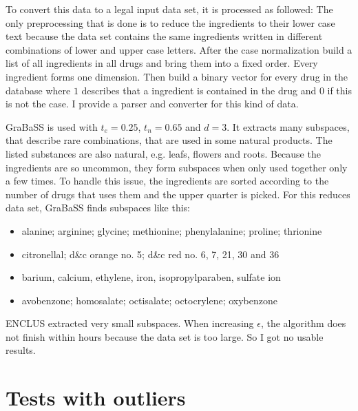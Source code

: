 To convert this data to a legal input data set, it is processed as followed: The only preprocessing that is done is to reduce the ingredients to their lower case text because the data set contains the same ingredients written in different combinations of lower and upper case letters. After the case normalization build a list of all ingredients in all drugs and bring them into a fixed order. Every ingredient forms one dimension. Then build a binary vector for every drug in the database where $1$ describes that a ingredient is contained in the drug and $0$ if this is not the case. I provide a parser and converter for this kind of data.

GraBaSS is used with $t_e = 0.25$, $t_n = 0.65$ and $d = 3$. It extracts many subspaces, that describe rare combinations, that are used in some natural products. The listed substances are also natural, e.g. leafs, flowers and roots. Because the ingredients are so uncommon, they form subspaces when only used together only a few times. To handle this issue, the ingredients are sorted according to the number of drugs that uses them and the upper quarter is picked. For this reduces data set, GraBaSS finds subspaces like this: 
\begin{itemize}
	\item alanine; arginine; glycine; methionine; phenylalanine; proline; thrionine
	\item citronellal; d\&c orange no. 5; d\&c red no. 6, 7, 21, 30 and 36
	\item barium, calcium, ethylene, iron, isopropylparaben, sulfate ion
	\item avobenzone; homosalate; octisalate; octocrylene; oxybenzone
\end{itemize}

ENCLUS extracted very small subspaces. When increasing $\epsilon$, the algorithm does not finish within hours because the data set is too large. So I got no usable results.

\section{Tests with outliers}

